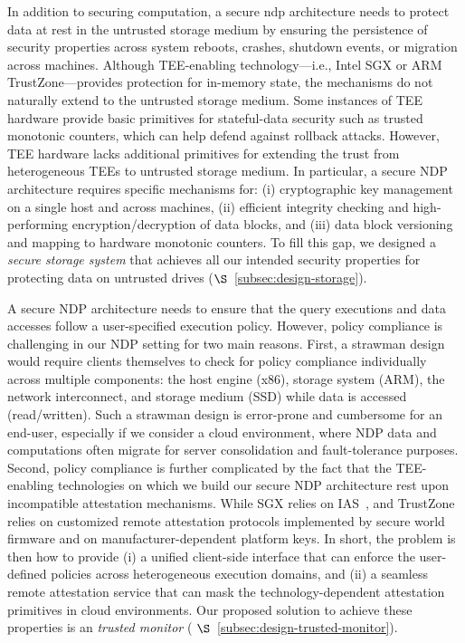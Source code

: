 In addition to securing computation, a secure ndp architecture needs to protect data at rest in the untrusted storage medium by ensuring the persistence of security properties across system reboots, crashes, shutdown events, or migration across machines. 
Although TEE-enabling technology---i.e., Intel SGX or ARM TrustZone---provides protection for in-memory state, the mechanisms do not naturally extend to the untrusted storage medium. 
Some instances of TEE hardware provide basic primitives for stateful-data security such as trusted monotonic counters, which can help defend against rollback attacks. 
However, TEE hardware lacks additional primitives for extending the trust from heterogeneous TEEs to untrusted storage medium. 
In particular, a secure NDP architecture requires specific mechanisms for: (i) cryptographic key management on a single host and across machines, (ii) efficient integrity checking and high-performing encryption/decryption of data blocks, and (iii) data block versioning and mapping to hardware monotonic counters. 
To fill this gap, we designed a \textit{secure storage system} that achieves all our intended security properties for protecting data on untrusted drives ($\S$~\ref{subsec:design-storage}).

 A secure NDP architecture needs to ensure that the query executions and data accesses follow a user-specified execution policy. However, policy compliance is challenging in our NDP setting for two main reasons. First, a strawman design would require clients themselves to check for policy compliance individually across multiple components: the host engine (x86), storage system (ARM), the network interconnect, and storage medium (SSD) while data is accessed (read/written). Such a strawman design is error-prone and cumbersome for an end-user, especially if we consider a cloud environment, where NDP data and computations often migrate for server consolidation and fault-tolerance purposes. Second, policy compliance is further complicated by the fact that the TEE-enabling technologies on which we build our secure NDP architecture rest upon incompatible attestation mechanisms. While SGX relies on IAS~\cite{ias, ananti-hasp-2013}, and TrustZone relies on customized remote attestation protocols implemented by secure world firmware and on manufacturer-dependent platform keys. In short, the problem is then how to provide (i) a unified client-side interface that can enforce the user-defined policies across heterogeneous execution domains, and (ii) a seamless remote attestation service that can mask the technology-dependent attestation primitives in cloud environments. Our proposed solution to achieve these properties is an \textit{trusted monitor} ( $\S$~\ref{subsec:design-trusted-monitor}).
\fi

